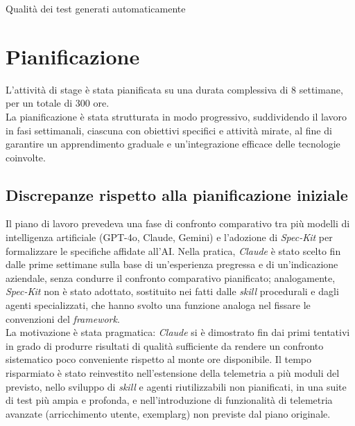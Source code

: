 \vspace{0.2cm}
\begin{risk}{Qualità dei test generati automaticamente}
      \label{risk:test-quality}
\end{risk}

\section{Pianificazione}
L’attività di stage è stata pianificata su una durata complessiva di 8 settimane, per un totale di 300 ore.
\\
La pianificazione è stata strutturata in modo progressivo, suddividendo il lavoro in fasi settimanali, ciascuna con obiettivi specifici e attività mirate, al fine di garantire un apprendimento graduale e un’integrazione efficace delle tecnologie coinvolte.

\subsection{Discrepanze rispetto alla pianificazione iniziale}

Il piano di lavoro prevedeva una fase di confronto comparativo tra più modelli
di intelligenza artificiale (GPT-4o, Claude, Gemini) e l'adozione di
\emph{Spec-Kit} per formalizzare le specifiche affidate all'AI. Nella pratica,
\emph{Claude} è stato scelto fin dalle prime settimane sulla base di
un'esperienza pregressa e di un'indicazione aziendale, senza condurre il
confronto comparativo pianificato; analogamente, \emph{Spec-Kit} non è stato
adottato, sostituito nei fatti dalle \emph{skill} procedurali e dagli agenti
specializzati, che hanno
svolto una funzione analoga nel fissare le convenzioni del \emph{framework}.\\
La motivazione è stata pragmatica: \emph{Claude} si è dimostrato fin dai primi
tentativi in grado di produrre risultati di qualità sufficiente da rendere un
confronto sistematico poco conveniente rispetto al monte ore disponibile. Il
tempo risparmiato è stato reinvestito nell'estensione della telemetria a più
moduli del previsto, nello sviluppo di \emph{skill} e agenti riutilizzabili non
pianificati, in una suite di test più ampia e profonda, e nell'introduzione di
funzionalità di telemetria avanzate (arricchimento utente, \gls{exemplarg}) non
previste dal piano originale.

